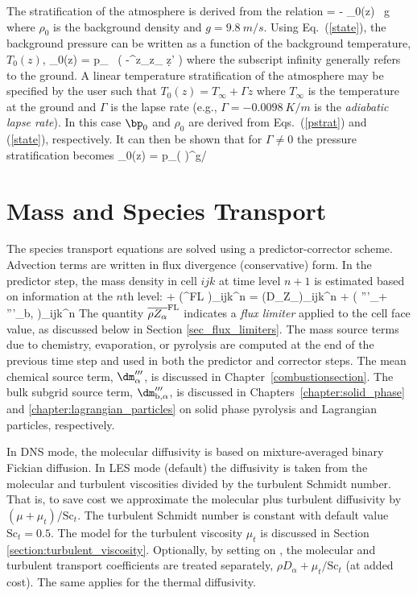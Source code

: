The stratification of the atmosphere is derived from the relation
\be {} = - \rho_0(z) \, g  \ee
where $\rho_0$ is the background density and $g=\SI{9.8}{m/s}$. Using Eq.~(\ref{state}), the background pressure can be written as a function of the background temperature, $T_0(z)$,
\be \bp_0(z) = p_\infty \; \exp \, \left( -\int^z_{z_\infty}  \d z' \right)  \label{pstrat} \ee
where the subscript infinity generally refers to the ground. A linear temperature stratification of the atmosphere may be
specified by the user such that $T_0(z) = T_\infty + \Gamma z$ where $T_\infty$ is the temperature at the ground and
$\Gamma$ is the lapse rate (e.g., $\Gamma = -\SI{0.0098}{K/m}$ is the {\em adiabatic lapse rate}).
In this case $\bp_0$ and $\rho_0$ are derived from Eqs.~(\ref{pstrat}) and (\ref{state}), respectively.
It can then be shown that for $\Gamma \ne 0$ the pressure stratification becomes
\be
   \bp_0(z) = p_\infty  \left(  \right)^{g/\R \Gamma}
   \label{pstrat2}
\ee


\section{Mass and Species Transport}

The species transport equations are solved using a predictor-corrector scheme. Advection terms are written in flux divergence (conservative) form. In the predictor step, the mass density in cell $ijk$ at time level $n+1$ is estimated based on information at the $n$th level:
\be  {}
  + \nabla\!\cdot(^{\rm FL} )_{ijk}^n
  = \nabla\!\cdot (\rho D_\alpha \nabla Z_\alpha)_{ijk}^n + \left( '''_\alpha + '''_{\rm b,\alpha} \right)_{ijk}^n
\ee
The quantity $\overline{\rho Z_\alpha}^{\rm FL}$ indicates a \emph{flux limiter} applied to the cell face value, as discussed below in Section \ref{sec_flux_limiters}. The mass source terms due to chemistry, evaporation, or pyrolysis are computed at the end of the previous time step and used in both the predictor and corrector steps. The mean chemical source term, $\dm_{\alpha}'''$, is discussed in Chapter~\ref{combustionsection}.  The bulk subgrid source term, $\dm_{\rm b,\alpha}'''$, is discussed in Chapters~\ref{chapter:solid_phase} and \ref{chapter:lagrangian_particles} on solid phase pyrolysis and Lagrangian particles, respectively.

In DNS mode, the molecular diffusivity is based on mixture-averaged binary Fickian diffusion.  In LES mode (default) the diffusivity is taken from the molecular and turbulent viscosities divided by the turbulent Schmidt number.  That is, to save cost we approximate the molecular plus turbulent diffusivity by $(\mu + \mu_t)/\mbox{Sc}_t$.   The turbulent Schmidt number is constant with default value $\mbox{Sc}_t = 0.5$.  The model for the turbulent viscosity $\mu_t$ is discussed in Section \ref{section:turbulent_viscosity}.  Optionally, by setting  on , the molecular and turbulent transport coefficients are treated separately, $\rho D_\alpha + \mu_t/\mbox{Sc}_t$ (at added cost).  The same applies for the thermal diffusivity.

